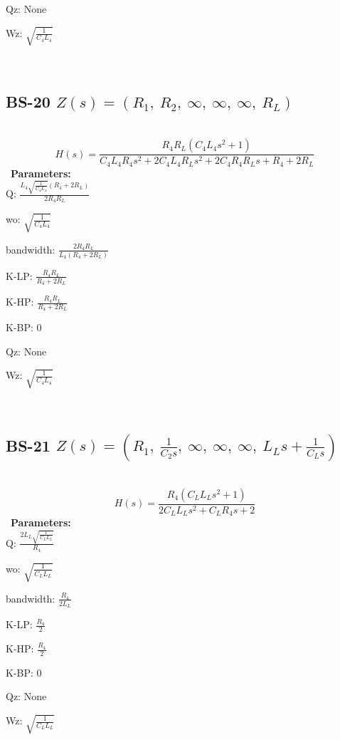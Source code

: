 \documentclass{article}
\begin{document}
Qz: $\text{None}$\ 

Wz: $\sqrt{\frac{1}{C_{4} L_{4}}}$\ 

\ 

\subsection{BS-20 $Z(s) = \left( R_{1}, \  R_{2}, \  \infty, \  \infty, \  \infty, \  R_{L}\right)$ } \ 
\textbf{\[H(s) = \frac{R_{4} R_{L} \left(C_{4} L_{4} s^{2} + 1\right)}{C_{4} L_{4} R_{4} s^{2} + 2 C_{4} L_{4} R_{L} s^{2} + 2 C_{4} R_{4} R_{L} s + R_{4} + 2 R_{L}}\] } \ 
\textbf{Parameters:}\\ 

Q: $\frac{L_{4} \sqrt{\frac{1}{C_{4} L_{4}}} \left(R_{4} + 2 R_{L}\right)}{2 R_{4} R_{L}}$\ 

wo: $\sqrt{\frac{1}{C_{4} L_{4}}}$\ 

bandwidth: $\frac{2 R_{4} R_{L}}{L_{4} \left(R_{4} + 2 R_{L}\right)}$\ 

K-LP: $\frac{R_{4} R_{L}}{R_{4} + 2 R_{L}}$\ 

K-HP: $\frac{R_{4} R_{L}}{R_{4} + 2 R_{L}}$\ 

K-BP: $0$\ 

Qz: $\text{None}$\ 

Wz: $\sqrt{\frac{1}{C_{4} L_{4}}}$\ 

\ 

\subsection{BS-21 $Z(s) = \left( R_{1}, \  \frac{1}{C_{2} s}, \  \infty, \  \infty, \  \infty, \  L_{L} s + \frac{1}{C_{L} s}\right)$ } \ 
\textbf{\[H(s) = \frac{R_{4} \left(C_{L} L_{L} s^{2} + 1\right)}{2 C_{L} L_{L} s^{2} + C_{L} R_{4} s + 2}\] } \ 
\textbf{Parameters:}\\ 

Q: $\frac{2 L_{L} \sqrt{\frac{1}{C_{L} L_{L}}}}{R_{4}}$\ 

wo: $\sqrt{\frac{1}{C_{L} L_{L}}}$\ 

bandwidth: $\frac{R_{4}}{2 L_{L}}$\ 

K-LP: $\frac{R_{4}}{2}$\ 

K-HP: $\frac{R_{4}}{2}$\ 

K-BP: $0$\ 

Qz: $\text{None}$\ 

Wz: $\sqrt{\frac{1}{C_{L} L_{L}}}$\ 

\ 
\end{document}
